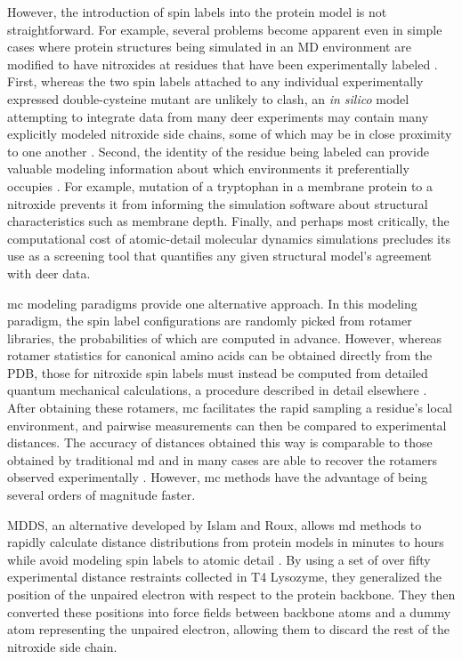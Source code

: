 However, the introduction of spin labels into the protein model is not straightforward. For example, several problems become apparent even in simple cases where protein structures being simulated in an MD environment are modified to have nitroxides at residues that have been experimentally labeled \citep*{Borovykh2006, Bowman2009, Brown2002, Corey2019, Hays2019, Islam2015, Islam2013, Marinelli2015, Marinelli2019, Roux2013}. First, whereas the two spin labels attached to any individual experimentally expressed double-cysteine mutant are unlikely to clash, an \emph{in silico} model attempting to integrate data from many \gls{deer} experiments may contain many explicitly modeled nitroxide side chains, some of which may be in close proximity to one another \citep*{Islam2013}. Second, the identity of the residue being labeled can provide valuable modeling information about which environments it preferentially occupies \citep*{Alexander2008}. For example, mutation of a tryptophan in a membrane protein to a nitroxide prevents it from informing the simulation software about structural characteristics such as membrane depth. Finally, and perhaps most critically, the computational cost of atomic-detail molecular dynamics simulations precludes its use as a screening tool that quantifies any given structural model's agreement with \gls{deer} data.

\Gls{mc} modeling paradigms provide one alternative approach. In this modeling paradigm, the spin label configurations are randomly picked from rotamer libraries, the probabilities of which are computed in advance. However, whereas rotamer statistics for canonical amino acids can be obtained directly from the PDB, those for nitroxide spin labels must instead be computed from detailed quantum mechanical calculations, a procedure described in detail elsewhere \citep*{Alexander2013, Edwards2014, Polyhach2011, Schmidt2015, Yang2020}. After obtaining these rotamers, \gls{mc} facilitates the rapid sampling a residue's local environment, and pairwise measurements can then be compared to experimental distances. The accuracy of distances obtained this way is comparable to those obtained by traditional \gls{md} \citep*{Klose2012} and in many cases are able to recover the rotamers observed experimentally \citep*{Alexander2013}. However, \gls{mc} methods have the advantage of being several orders of magnitude faster.

MDDS, an alternative developed by Islam and Roux, allows \gls{md} methods to rapidly calculate distance distributions from protein models in minutes to hours while avoid modeling spin labels to atomic detail \citep*{Islam2013}. By using a set of over fifty experimental distance restraints collected in T4 Lysozyme, they generalized the position of the unpaired electron with respect to the protein backbone. They then converted these positions into force fields between backbone atoms and a dummy atom representing the unpaired electron, allowing them to discard the rest of the nitroxide side chain.


